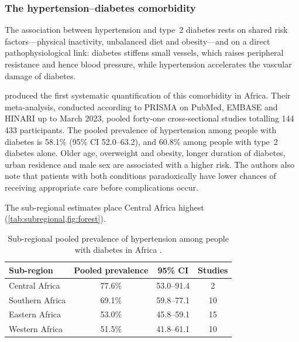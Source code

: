\subsubsection{The hypertension--diabetes comorbidity}\label{sec:comorbidity}

The association between hypertension and type~2 diabetes rests on shared risk factors---physical inactivity, unbalanced diet and obesity---and on a direct pathophysiological link: diabetes stiffens small vessels, which raises peripheral resistance and hence blood pressure, while hypertension accelerates the vascular damage of diabetes.

\Textcite{hinneh2023} produced the first systematic quantification of this comorbidity in Africa. Their meta-analysis, conducted according to PRISMA on PubMed, EMBASE and HINARI up to March 2023, pooled forty-one cross-sectional studies totalling 144\,433 participants. The pooled prevalence of hypertension among people with diabetes is 58.1\% (95\% CI 52.0--63.2), and 60.8\% among people with type~2 diabetes alone. Older age, overweight and obesity, longer duration of diabetes, urban residence and male sex are associated with a higher risk. The authors also note that patients with both conditions paradoxically have lower chances of receiving appropriate care before complications occur.

The sub-regional estimates place Central Africa highest (\cref{tab:subregional,fig:forest}).

\begin{table}[htbp]
\centering\small
\caption{Sub-regional pooled prevalence of hypertension among people with diabetes in Africa \parencite{hinneh2023}.}\label{tab:subregional}
\begin{tabular}{@{}lccc@{}}
\toprule
\textbf{Sub-region} & \textbf{Pooled prevalence} & \textbf{95\% CI} & \textbf{Studies} \\
\midrule
Central Africa & 77.6\% & 53.0--91.4 & 2 \\
Southern Africa & 69.1\% & 59.8--77.1 & 10 \\
Eastern Africa & 53.0\% & 45.8--59.1 & 15 \\
Western Africa & 51.5\% & 41.8--61.1 & 10 \\
\bottomrule
\end{tabular}
\end{table}

